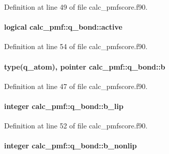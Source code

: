 Definition at line 49 of file calc\-\_\-pmfscore.\-f90.

\hypertarget{structcalc__pmf_1_1q__bond_ae32264128b887aafa67ffa66ae39d453}{
\paragraph[{active}]{\setlength{\rightskip}{0pt plus 5cm}logical calc\-\_\-pmf\-::q\-\_\-bond\-::active}}\label{structcalc__pmf_1_1q__bond_ae32264128b887aafa67ffa66ae39d453}


Definition at line 54 of file calc\-\_\-pmfscore.\-f90.

\hypertarget{structcalc__pmf_1_1q__bond_a1e988d86ee0094a8176ad57e5edbe9a1}{
\paragraph[{b}]{\setlength{\rightskip}{0pt plus 5cm}type({\bf q\-\_\-atom}), pointer calc\-\_\-pmf\-::q\-\_\-bond\-::b}}\label{structcalc__pmf_1_1q__bond_a1e988d86ee0094a8176ad57e5edbe9a1}


Definition at line 47 of file calc\-\_\-pmfscore.\-f90.

\hypertarget{structcalc__pmf_1_1q__bond_ab195c4f156b5952e175a5c95f5de2aac}{
\paragraph[{b\-\_\-lip}]{\setlength{\rightskip}{0pt plus 5cm}integer calc\-\_\-pmf\-::q\-\_\-bond\-::b\-\_\-lip}}\label{structcalc__pmf_1_1q__bond_ab195c4f156b5952e175a5c95f5de2aac}


Definition at line 52 of file calc\-\_\-pmfscore.\-f90.

\hypertarget{structcalc__pmf_1_1q__bond_a2d285a6d3ea22adcc51719298d14d4e3}{
\paragraph[{b\-\_\-nonlip}]{\setlength{\rightskip}{0pt plus 5cm}integer calc\-\_\-pmf\-::q\-\_\-bond\-::b\-\_\-nonlip}}\label{structcalc__pmf_1_1q__bond_a2d285a6d3ea22adcc51719298d14d4e3}


